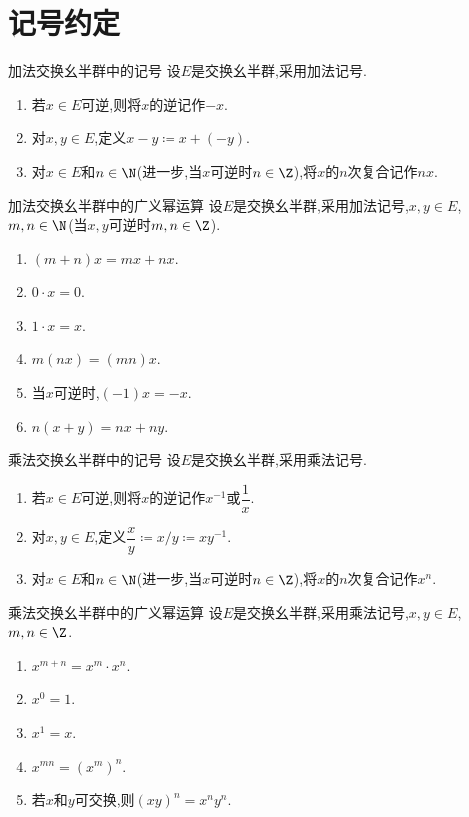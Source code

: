 \section{记号约定}

\begin{remark}{加法交换幺半群中的记号}{}
	设$E$是交换幺半群,采用加法记号.
	\begin{enumerate}
		\item 若$x\in E$可逆,则将$x$的逆记作$-x$.
		\item 对$x,y\in E$,定义$x-y\coloneq x+\left(-y\right)$.
		\item 对$x\in E$和$n\in\N$(进一步,当$x$可逆时$n\in\Z$),将$x$的$n$次复合记作$nx$.
	\end{enumerate}
\end{remark}

\begin{theorem}{加法交换幺半群中的广义幂运算}{}
	设$E$是交换幺半群,采用加法记号,$x,y\in E$,$m,n\in\N$(当$x,y$可逆时$m,n\in\Z$).
	\begin{enumerate}
		\item $\left(m+n\right)x=mx+nx$.
		\item $0\cdot x=0$.
		\item $1\cdot x=x$.
		\item $m\left(nx\right)=\left(mn\right)x$.
		\item 当$x$可逆时,$\left(-1\right)x=-x$.
		\item $n\left(x+y\right)=nx+ny$.
	\end{enumerate}
\end{theorem}


\begin{remark}{乘法交换幺半群中的记号}{}
	设$E$是交换幺半群,采用乘法记号.
	\begin{enumerate}
		\item 若$x\in E$可逆,则将$x$的逆记作$x^{-1}$或$\dfrac{1}{x}$.
		\item 对$x,y\in E$,定义$\dfrac{x}{y}\coloneq x/y\coloneq xy^{-1}$.
		\item 对$x\in E$和$n\in\N$(进一步,当$x$可逆时$n\in\Z$),将$x$的$n$次复合记作$x^{n}$.
	\end{enumerate}
\end{remark}

\begin{theorem}{乘法交换幺半群中的广义幂运算}{}
	设$E$是交换幺半群,采用乘法记号,$x,y\in E$,$m,n\in\Z$.
	\begin{enumerate}
		\item $x^{m+n}=x^{m}\cdot x^{n}$.
		\item $x^{0}=1$.
		\item $x^{1}=x$.
		\item $x^{mn}=\left(x^{m}\right)^{n}$.
		\item 若$x$和$y$可交换,则$\left(xy\right)^{n}=x^{n}y^{n}$.
	\end{enumerate}
\end{theorem}